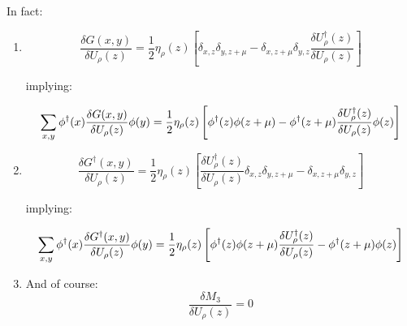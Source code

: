 \documentclass[12pt, a4paper]{article}
\begin{document}
\begin{enumerate}
In fact:
\begin{enumerate}
    \item 
    \begin{equation}
    \frac{\delta G(x, y)}{\delta U_{\rho}(z)} =
    \frac{1}{2} \eta_\rho(z) 
    \left[ 
    \delta_{x,z} \delta_{y, z+\mu} -
    \delta_{x,z+\mu} \delta_{y, z} 
    \frac{\delta U^{\dagger}_{\rho}(z)}{\delta U_{\rho}(z)} 
    \right]
    \end{equation}
    
    implying:
    
    \begin{equation}
    \sum_{x, y} 
    \phi^{\dagger}(x) 
    \frac{\delta G(x, y)}{\delta U_{\rho}(z)} 
    \phi(y)
    \\=
    \frac{1}{2} \eta_\rho(z) 
    \left[
    \phi^{\dagger}(z) \phi(z+\mu) 
    -\phi^{\dagger}(z+\mu) 
    \frac{\delta U^{\dagger}_{\rho}(z)}{\delta U_{\rho}(z)} \phi(z)
    \right]
    \end{equation}
    \item
    \begin{equation}
    \frac{\delta G^{\dagger}(x, y)}{\delta U_{\rho}(z)} =
    \frac{1}{2} \eta_\rho(z) 
    \left[
    \frac{\delta U^{\dagger}_{\rho}(z)}{\delta U_{\rho}(z)}
    \delta_{x,z} \delta_{y, z+\mu} -
    \delta_{x,z+\mu} \delta_{y, z} 
    \right]
    \end{equation}
    
    implying:
    
    \begin{equation}
    \sum_{x, y} 
    \phi^{\dagger}(x) 
    \frac{\delta G^{\dagger}(x, y)}{\delta U_{\rho}(z)} 
    \phi(y)
    \\ =
    \frac{1}{2} \eta_\rho(z) 
    \left[
    \phi^{\dagger}(z) \phi(z+\mu) 
    \frac{\delta U^{\dagger}_{\rho}(z)}{\delta U_{\rho}(z)}
    -\phi^{\dagger}(z+\mu) \phi(z)
    \right]
    \end{equation}
%
\item
%
And of course:
\begin{equation}
\frac{\delta M_3}{\delta U_{\rho}(z)} = 0
\end{equation}
\end{enumerate}

\end{enumerate}
\end{document}
